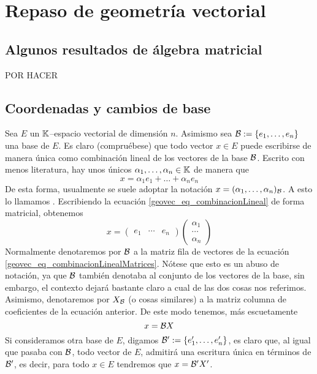 \chapter{Repaso de geometría vectorial}
\label{geovec}
\section{Algunos resultados de álgebra matricial}
POR HACER
\section{Coordenadas y cambios de base}
\label{geovec_coordenadas}
Sea $E$ un $\mathbb{K}$--espacio vectorial de dimensión $n$. Asimismo sea $\mathcal{B}:=\{e_1,\dots,e_n\}$ una base de $E$. Es claro (compruébese) que todo vector $x\in E$ puede escribirse de manera única como combinación lineal de los vectores de la base $\mathcal{B}$. Escrito con menos literatura, hay unos únicos $\alpha_1,\dots,\alpha_n\in\mathbb{K}$ de manera que
\begin{equation}
	\label{geovec_eq_combinacionLineal}
	x=\alpha_1e_1+\dots+\alpha_ne_n
\end{equation}
De esta forma, usualmente se suele adoptar la notación $x=(\alpha_1,\dots,\alpha_n)_{\mathcal{B}}$. A esto lo llamamos . Escribiendo la ecuación \eqref{geovec_eq_combinacionLineal} de forma matricial, obtenemos
\begin{equation}
	\label{geovec_eq_combinacionLinealMatrices}
	x=\begin{pmatrix}
	e_1 & \cdots & e_n
	\end{pmatrix}\begin{pmatrix}
	\alpha_1\\
	\cdots\\
	\alpha_n
	\end{pmatrix}
\end{equation}
Normalmente denotaremos por $\mathcal{B}$ a la matriz fila de vectores de la ecuación \eqref{geovec_eq_combinacionLinealMatrices}. Nótese que esto es un abuso de notación, ya que $\mathcal{B}$ también denotaba al conjunto de los vectores de la base, sin embargo, el contexto dejará bastante claro a cual de las dos cosas nos referimos. Asimismo, denotaremos por $X_{\mathcal{B}}$ (o cosas similares) a la matriz columna de coeficientes de la ecuación anterior. De este modo tenemos, más escuetamente
\begin{equation*}
	x=\mathcal{B}X
\end{equation*}
Si consideramos otra base de $E$, digamos $\mathcal{B}':=\{e_1',\dots,e_n'\}$, es claro que, al igual que pasaba con $\mathcal{B}$, todo vector de $E$, admitirá una escritura única en términos de $\mathcal{B}'$, es decir, para todo $x\in E$ tendremos que $x=\mathcal{B}'X'$.

